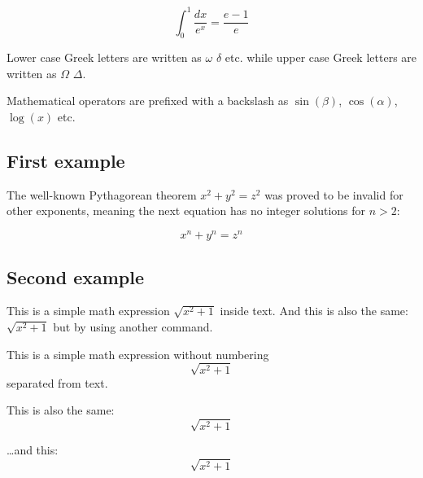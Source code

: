 \documentclass[12pt, letterpaper]{article}
\begin{document}
    \[ \int_0^1 \frac{dx}{e^x} =  \frac{e-1}{e} \]

    Lower case Greek letters are written as $\omega$ $\delta$ etc.
    while upper case Greek letters are written as $\Omega$ $\Delta$.

    Mathematical operators are prefixed with a backslash as $\sin(\beta)$, $\cos(\alpha)$, $\log(x)$ etc.

    \subsection{First example}\label{subsec:first-example}

    The well-known Pythagorean theorem \(x^2 + y^2 = z^2\) was proved to be invalid for other exponents, meaning the next equation has no integer solutions for \(n>2\):

    \[ x^n + y^n = z^n \]

    \subsection{Second example}\label{subsec:second-example}

    This is a simple math expression \(\sqrt{x^2+1}\) inside text.
    And this is also the same:
    \begin{math}
        \sqrt{x^2+1}
    \end{math}
    but by using another command.

    This is a simple math expression without numbering
    \[\sqrt{x^2+1}\]
    separated from text.

    This is also the same:
    \begin{displaymath}
        \sqrt{x^2+1}
    \end{displaymath}

    \ldots and this:
    \begin{equation*}
        \sqrt{x^2+1}
    \end{equation*}
\end{document}
